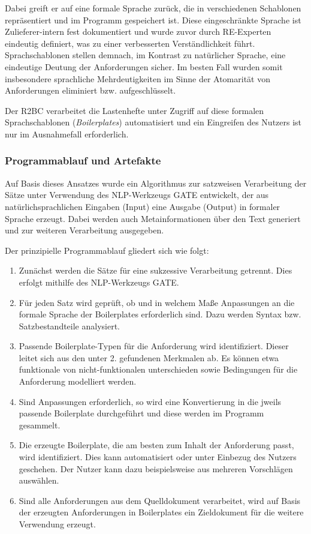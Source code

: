 \documentclass[12pt]{report}
\begin{document}
Dabei greift er auf eine formale Sprache zurück, die in verschiedenen Schablonen repräsentiert und im Programm gespeichert ist. Diese eingeschränkte Sprache ist Zulieferer-intern fest dokumentiert und wurde zuvor durch RE-Experten eindeutig definiert, was zu einer verbesserten Verständlichkeit führt. Sprachschablonen stellen demnach, im Kontrast zu natürlicher Sprache, eine eindeutige Deutung der Anforderungen sicher. Im besten Fall wurden somit insbesondere sprachliche Mehrdeutigkeiten im Sinne der Atomarität von Anforderungen eliminiert bzw. aufgeschlüsselt.

Der R2BC verarbeitet die Lastenhefte unter Zugriff auf diese formalen Sprachschablonen (\textit{Boilerplates}) automatisiert und ein Eingreifen des Nutzers ist nur im Ausnahmefall erforderlich. 

\subsubsection{Programmablauf und Artefakte}
Auf Basis dieses Ansatzes wurde ein Algorithmus zur satzweisen Verarbeitung der Sätze unter Verwendung des NLP-Werkzeugs GATE entwickelt, der aus natürlichsprachlichen Eingaben (Input) eine Ausgabe (Output) in formaler Sprache erzeugt. Dabei werden auch Metainformationen über den Text generiert und zur weiteren Verarbeitung ausgegeben.

Der prinzipielle Programmablauf gliedert sich wie folgt:
\begin{enumerate}
\item Zunächst werden die Sätze für eine sukzessive Verarbeitung getrennt. Dies erfolgt mithilfe des NLP-Werkzeugs GATE.
\item Für jeden Satz wird geprüft, ob und in welchem Maße Anpassungen an die formale Sprache der Boilerplates erforderlich sind. Dazu werden Syntax bzw. Satzbestandteile analysiert.
\item Passende Boilerplate-Typen für die Anforderung wird identifiziert. Dieser leitet sich aus den unter 2. gefundenen Merkmalen ab. Es können etwa funktionale von nicht-funktionalen unterschieden sowie Bedingungen für die Anforderung modelliert werden.
\item Sind Anpassungen erforderlich, so wird eine Konvertierung in die jweils passende Boilerplate durchgeführt und diese werden im Programm gesammelt. 
\item Die erzeugte Boilerplate, die am besten zum Inhalt der Anforderung passt, wird identifiziert. Dies kann automatisiert oder unter Einbezug des Nutzers geschehen. Der Nutzer kann dazu beispielsweise aus mehreren Vorschlägen auswählen.
\item Sind alle Anforderungen aus dem Quelldokument verarbeitet, wird auf Basis der erzeugten Anforderungen in Boilerplates ein Zieldokument für die weitere Verwendung erzeugt.
\end{enumerate}
\end{document}
